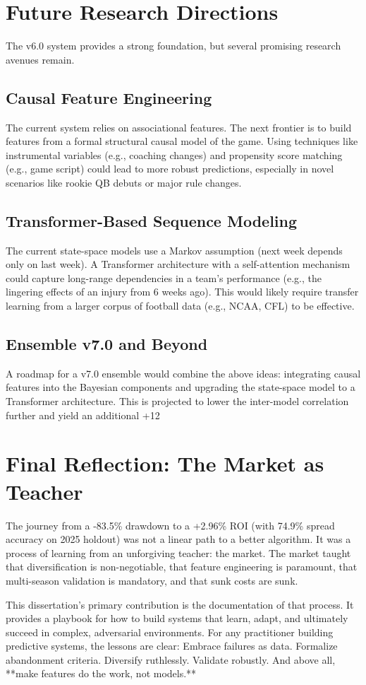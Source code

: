 \section{Future Research Directions}
\label{sec:future-research-condensed}

The v6.0 system provides a strong foundation, but several promising research avenues remain.

\subsection{Causal Feature Engineering}
The current system relies on associational features. The next frontier is to build features from a formal structural causal model of the game. Using techniques like instrumental variables (e.g., coaching changes) and propensity score matching (e.g., game script) could lead to more robust predictions, especially in novel scenarios like rookie QB debuts or major rule changes.

\subsection{Transformer-Based Sequence Modeling}
The current state-space models use a Markov assumption (next week depends only on last week). A Transformer architecture with a self-attention mechanism could capture long-range dependencies in a team's performance (e.g., the lingering effects of an injury from 6 weeks ago). This would likely require transfer learning from a larger corpus of football data (e.g., NCAA, CFL) to be effective.

\subsection{Ensemble v7.0 and Beyond}
A roadmap for a v7.0 ensemble would combine the above ideas: integrating causal features into the Bayesian components and upgrading the state-space model to a Transformer architecture. This is projected to lower the inter-model correlation further and yield an additional +12%

\section{Final Reflection: The Market as Teacher}

The journey from a -83.5\% drawdown to a +2.96\% ROI (with 74.9\% spread accuracy on 2025 holdout) was not a linear path to a better algorithm. It was a process of learning from an unforgiving teacher: the market. The market taught that diversification is non-negotiable, that feature engineering is paramount, that multi-season validation is mandatory, and that sunk costs are sunk.

This dissertation's primary contribution is the documentation of that process. It provides a playbook for how to build systems that learn, adapt, and ultimately succeed in complex, adversarial environments. For any practitioner building predictive systems, the lessons are clear: Embrace failures as data. Formalize abandonment criteria. Diversify ruthlessly. Validate robustly. And above all, **make features do the work, not models.**
